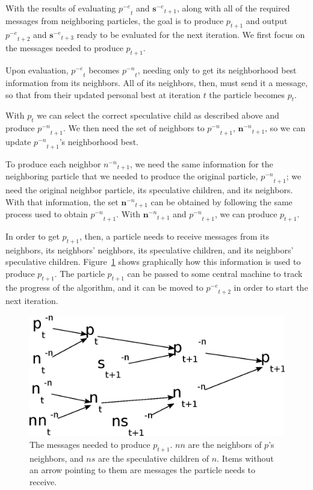 \documentclass[conference,letterpaper]{IEEEtran}
\newcommand{\fig}[1]{Figure~\ref{fig:#1}}
\providecommand{\noeval}[1]{\ensuremath{#1^{-e}}}
\providecommand{\nonbest}[1]{\ensuremath{#1^{-n}}}
\providecommand{\p}{\ensuremath{p}}
\providecommand{\sset}{\ensuremath{\mathbf{s}}}
\providecommand{\n}{\ensuremath{n}}
\providecommand{\nset}{\ensuremath{\mathbf{n}}}
\begin{document}
With the results of evaluating $\noeval{\p}_t$ and $\noeval{\sset}_{t+1}$,
along with all of the required messages from neighboring particles, the goal is
to produce $\p_{t+1}$ and output $\noeval{\p}_{t+2}$ and $\noeval{\sset}_{t+3}$
ready to be evaluated for the next iteration.  We first focus on the messages
needed to produce $\p_{t+1}$.

Upon evaluation, $\noeval{\p}_t$ becomes $\nonbest{\p}_t$, needing only to get
its neighborhood best information from its neighbors.  All of its neighbors,
then, must send it a message, so that from their updated personal best at
iteration $t$ the particle becomes $\p_t$.

With $\p_t$ we can select the correct speculative child as described above and
produce $\nonbest{\p}_{t+1}$.  We then need the set of neighbors to
$\nonbest{\p}_{t+1}$, $\nonbest{\nset}_{t+1}$, so we can update
$\nonbest{\p}_{t+1}$'s neighborhood best.

To produce each neighbor $\nonbest{\n}_{t+1}$, we need the same information for
the neighboring particle that we needed to produce the original particle,
$\nonbest{\p}_{t+1}$; we need the original neighbor particle, its speculative
children, and its neighbors.  With that information, the set
$\nonbest{\nset}_{t+1}$ can be obtained by following the same process used to
obtain $\nonbest{\p}_{t+1}$.  With $\nonbest{\nset}_{t+1}$ and
$\nonbest{\p}_{t+1}$, we can produce $\p_{t+1}$.

In order to get $\p_{t+1}$, then, a particle needs to receive messages from its
neighbors, its neighbors' neighbors, its speculative children, and its
neighbors' speculative children.  \fig{origparticle} shows graphically how this
information is used to produce $\p_{t+1}$.  The particle $\p_{t+1}$ can be
passed to some central machine to track the progress of the algorithm, and it
can be moved to $\noeval{\p}_{t+2}$ in order to start the next iteration.

\begin{figure}
  \centering
  \includegraphics[width=\columnwidth]{messages.eps}
  \caption{The messages needed to produce $\p_{t+1}$. $nn$ are the neighbors
  of $p$'s neighbors, and $ns$ are the speculative children of $n$.  Items
  without an arrow pointing to them are messages the particle needs to receive.}
  \label{fig:origparticle}
\end{figure}
\end{document}

